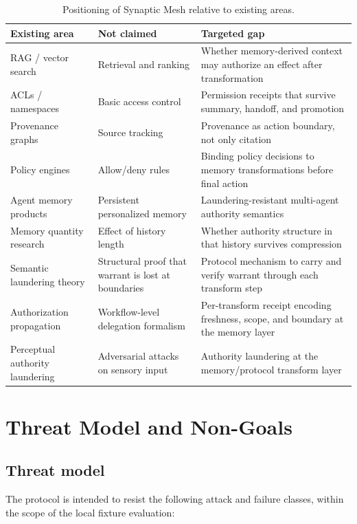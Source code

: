 \documentclass[11pt]{article}
\begin{document}
\begin{table}[h]
\centering
\caption{Positioning of Synaptic Mesh relative to existing areas.}
\label{tab:diff}
\begin{tabularx}{\textwidth}{@{}XXX@{}}
\toprule
\textbf{Existing area} & \textbf{Not claimed} & \textbf{Targeted gap} \\
\midrule
RAG / vector search & Retrieval and ranking & Whether memory-derived context may
authorize an effect after transformation \\
ACLs / namespaces & Basic access control & Permission receipts that survive
summary, handoff, and promotion \\
Provenance graphs & Source tracking & Provenance as action boundary, not only
citation \\
Policy engines & Allow/deny rules & Binding policy decisions to memory
transformations before final action \\
Agent memory products & Persistent personalized memory & Laundering-resistant
multi-agent authority semantics \\
Memory quantity research & Effect of history length & Whether authority structure
in that history survives compression \\
Semantic laundering theory & Structural proof that warrant is lost at boundaries &
Protocol mechanism to carry and verify warrant through each transform step \\
Authorization propagation & Workflow-level delegation formalism & Per-transform
receipt encoding freshness, scope, and boundary at the memory layer \\
Perceptual authority laundering & Adversarial attacks on sensory input & Authority
laundering at the memory/protocol transform layer \\
\bottomrule
\end{tabularx}
\end{table}

\section{Threat Model and Non-Goals}
\label{sec:threats}

\subsection{Threat model}

The protocol is intended to resist the following attack and failure classes,
within the scope of the local fixture evaluation:
\end{document}
